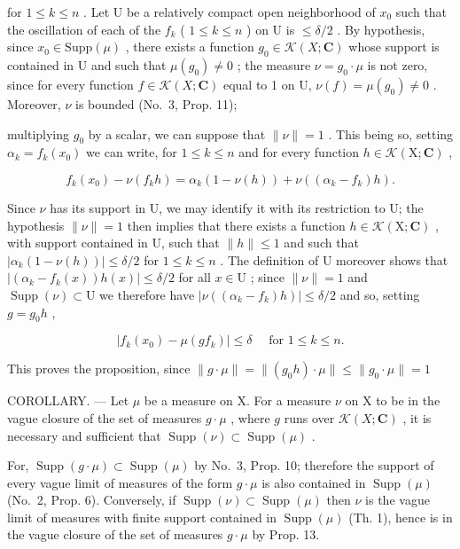 for \(1 \leqslant k \leqslant n\) . Let U be a relatively compact open neighborhood of \(x_0\) such that the oscillation of each of the \(f_k\) ( \(1 \leqslant k \leqslant n\) ) on U is \(\leqslant \delta/2\) . By hypothesis, since \(x_0 \in \text{Supp}(\mu)\) , there exists a function \(g_0 \in \mathcal{K}(X; \mathbf{C})\) whose support is contained in U and such that \(\mu(g_0) \neq 0\) ; the measure \(\nu = g_0 \cdot \mu\) is not zero, since for every function \(f \in \mathcal{K}(X; \mathbf{C})\) equal to 1 on U, \(\nu(f) = \mu(g_0) \neq 0\) . Moreover, \(\nu\) is bounded (No.~3, Prop. 11);

multiplying \(g_{0}\) by a scalar, we can suppose that \(\|\nu\|=1\) . This being so, setting \(\alpha_{k}=f_{k}(x_{0})\) we can write, for \(1\leqslant k\leqslant n\) and for every function \(h\in\mathcal{K}(\mathrm{X};\mathbf{C})\) ,

\[
f _ {k} (x _ {0}) - \nu (f _ {k} h) = \alpha_ {k} (1 - \nu (h)) + \nu ((\alpha_ {k} - f _ {k}) h).
\]

Since \(\nu\) has its support in U, we may identify it with its restriction to U; the hypothesis \(\| \nu \| = 1\) then implies that there exists a function \(h \in \mathcal{K}(\mathrm{X};\mathbf{C})\) , with support contained in U, such that \(\| h \| \leqslant 1\) and such that \(|\alpha_{k}(1 - \nu (h))| \leqslant \delta / 2\) for \(1 \leqslant k \leqslant n\) . The definition of U moreover shows that \(|(\alpha_{k} - f_{k}(x))h(x)| \leqslant \delta / 2\) for all \(x \in \mathrm{U}\) ; since \(\| \nu \| = 1\) and \(\operatorname{Supp}(\nu) \subset \mathrm{U}\) we therefore have \(|\nu ((\alpha_{k} - f_{k})h)| \leqslant \delta / 2\) and so, setting \(g = g_0h\) ,

\[
\left| f _ {k} \left(x _ {0}\right) - \mu \left(g f _ {k}\right) \right| \leqslant \delta \quad \text { for } 1 \leqslant k \leqslant n.
\]

This proves the proposition, since \(\| g\cdot \mu \| = \| (g_0h)\cdot \mu \| \leqslant \| g_0\cdot \mu \| = 1\)

COROLLARY. --- Let \(\mu\) be a measure on X. For a measure \(\nu\) on X to be in the vague closure of the set of measures \(g \cdot \mu\) , where \(g\) runs over \(\mathcal{K}(X; \mathbf{C})\) , it is necessary and sufficient that \(\operatorname{Supp}(\nu) \subset \operatorname{Supp}(\mu)\) .

For, \(\operatorname{Supp}(g\cdot\mu)\subset\operatorname{Supp}(\mu)\) by No.~3, Prop. 10; therefore the support of every vague limit of measures of the form \(g\cdot\mu\) is also contained in \(\operatorname{Supp}(\mu)\) (No.~2, Prop. 6). Conversely, if \(\operatorname{Supp}(\nu)\subset\operatorname{Supp}(\mu)\) then \(\nu\) is the vague limit of measures with finite support contained in \(\operatorname{Supp}(\mu)\) (Th. 1), hence is in the vague closure of the set of measures \(g\cdot\mu\) by Prop. 13.

